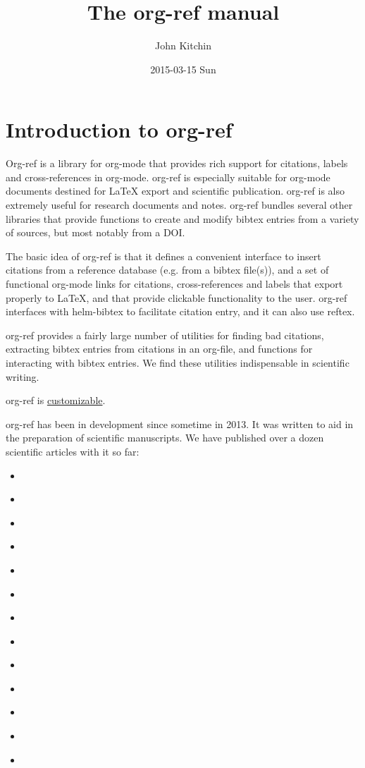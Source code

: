 \documentclass[11pt]{article}
\author{John Kitchin}
\date{2015-03-15 Sun}
\title{The org-ref manual}
\begin{document}
\maketitle
\maketitle
\tableofcontents


\section{Introduction to org-ref}
\label{sec:org70a82f0}

Org-ref is a library for org-mode \cite{Dominik201408} that provides rich support for citations, labels and cross-references in org-mode. org-ref is especially suitable for org-mode documents destined for \LaTeX{} export and scientific publication. org-ref is also extremely useful for research documents and notes. org-ref bundles several other libraries that provide functions to create and modify bibtex entries from a variety of sources, but most notably from a DOI.

The basic idea of org-ref is that it defines a convenient interface to insert citations from a reference database (e.g. from a bibtex file(s)), and a set of functional org-mode links for citations, cross-references and labels that export properly to \LaTeX{}, and that provide clickable functionality to the user. org-ref interfaces with helm-bibtex to facilitate citation entry, and it can also use reftex.

org-ref provides a fairly large number of utilities for finding bad citations, extracting bibtex entries from citations in an org-file, and functions for interacting with bibtex entries. We find these utilities indispensable in scientific writing.

org-ref is \hyperref[sec:org69126c1]{customizable}.

org-ref has been in development since sometime in 2013. It was written to aid in the preparation of scientific manuscripts. We have published over a dozen scientific articles with it so far:

\begin{itemize}
\item \cite{hallenbeck-2013-effec}
\item \cite{mehta-2014-ident-poten}
\item \cite{xu-2014-relat-elect}
\item \cite{xu-2014-probin-cover}
\item \cite{miller-2014-simul-temper}
\item \cite{curnan-2014-effec-concen}
\item \cite{boes-2015-estim-bulk}
\item \cite{xu-2015-linear-respon}
\item \cite{xu-2015-relat-between}
\item \cite{boes-2016-neural-networ}
\item \cite{boes-2017-neural-networ}
\item \cite{xu-2017-first-princ}
\item \cite{geng-2017-first-princ}
\end{itemize}
\end{document}
